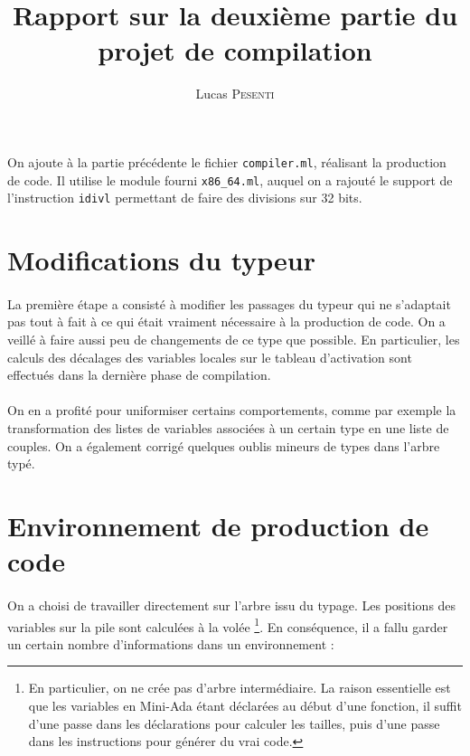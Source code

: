 \documentclass[a4paper,12pt]{article}
\title{Rapport sur la deuxième partie du projet de compilation}
\author{Lucas \textsc{Pesenti}}
\date{}
\begin{document}
\maketitle
\paragraph*{}
On ajoute à la partie précédente le fichier \texttt{compiler.ml}, réalisant la production de code. Il utilise le module fourni \texttt{x86\_64.ml}, auquel on
a rajouté le support de l'instruction \texttt{idivl} permettant de faire des divisions sur 32 bits.

\section{Modifications du typeur}

\paragraph*{}
La première étape a consisté à modifier les passages du typeur qui ne s'adaptait pas tout à fait à ce qui était vraiment
nécessaire à la production de code. On a veillé à faire aussi peu de changements de ce type que possible. En particulier,
les calculs des décalages des variables locales sur le tableau d'activation sont effectués dans la dernière phase de
compilation.

\paragraph*{}
On en a profité pour uniformiser certains comportements, comme par exemple la transformation des listes de variables associées
à un certain type en une liste de couples. On a également corrigé quelques oublis mineurs de types dans l'arbre typé.

\section{Environnement de production de code}

\paragraph*{}
On a choisi de travailler directement sur l'arbre issu du typage. Les positions des variables sur la pile sont calculées à la
volée \footnote{En particulier, on ne crée pas d'arbre intermédiaire. La raison essentielle est que les variables en Mini-Ada étant
déclarées au début d'une fonction, il suffit d'une passe dans les déclarations pour calculer les tailles, puis d'une passe dans
les instructions pour générer du vrai code.}. En conséquence, il a fallu garder un certain nombre d'informations dans un
environnement :
\end{document}
